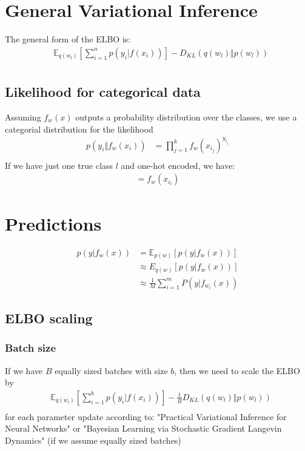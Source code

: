 \documentclass[a4paper]{scrartcl}
\begin{document}
\section{General Variational Inference}
    The general form of the ELBO is:
    \begin{align*}
        & \mathbb{E}_{q(w_l)}[\sum_{i=1}^n p(y_i \vert f(x_i))] - D_{KL}(q(w_l) \Vert p(w_l))\\
    \end{align*}

  \subsection{Likelihood for categorical data}
      Assuming $f_w(x)$ outputs a probability distribution over the classes, we use a categorial distribution for the likelihood
      \begin{align*}
          p(y_i \Vert f_w(x_i))
          &= \prod_{j=1}^k f_w(x_{i_j})^{y_{i_j}} \\
      \end{align*}
      If we have just one true class $l$ and one-hot encoded, we have:
      \begin{align*}
          = f_w(x_{i_l})
      \end{align*}

  \section{Predictions}
  \begin{align*}
      p(y \vert f_w(x)) 
      &= \mathbb{E}_{p(w)}[p(y \vert f_w(x))]\\
      &\approx E_{q(w)}[p(y \vert f_w(x))]\\
      &\approx \frac{1}{M}\sum_{i=1}^m P(y \vert f_{w_i}(x))
  \end{align*}

  \subsection{ELBO scaling}
    \subsubsection{Batch size}
      If we have $B$ equally sized batches with size $b$, then we need to scale the ELBO by
      \begin{align*}
        & \mathbb{E}_{q(w_l)}[\sum_{i=1}^b p(y_i \vert f(x_i))] - \frac{1}{B} D_{KL}(q(w_l) \Vert p(w_l))\\
      \end{align*}
      for each parameter update according to: "Practical Variational Inference
      for Neural Networks"
      or "Bayesian Learning via Stochastic Gradient Langevin Dynamics" (if we assume equally sized batches)
\end{document}
